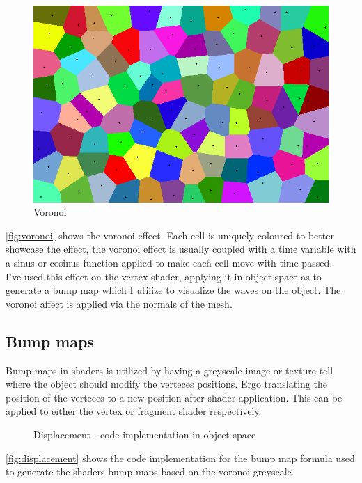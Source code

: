 \documentclass{article}
\begin{document}
\begin{figure}[H]
    \centering
    \includegraphics[width=.75\textwidth]{img/voronoi}
    \caption{Voronoi\protect\footnotemark}
    \label{fig:voronoi}
\end{figure}
\autoref{fig:voronoi} shows the voronoi effect. Each cell is uniquely coloured to better showcase the effect, the voronoi effect is usually coupled with a time variable with a sinus or cosinus function applied to make each cell move with time passed.\\

I've used this effect on the vertex shader, applying it in object space as to generate a bump map which I utilize to visualize the waves on the object. The voronoi affect is applied via the normals of the mesh.

\subsection{Bump maps}
\label{sec:bump_map}
Bump maps in shaders is utilized by having a greyscale image or texture tell where the object should modify the verteces positions. Ergo translating the position of the verteces to a new position after shader application. This can be applied to either the vertex or fragment shader respectively.

\begin{figure}[H]
    \centering
    
    \caption{Displacement - code implementation in object space}
    \label{fig:displacement}
\end{figure}
\autoref{fig:displacement} shows the code implementation for the bump map formula used to generate the shaders bump maps based on the voronoi greyscale.
\end{document}
